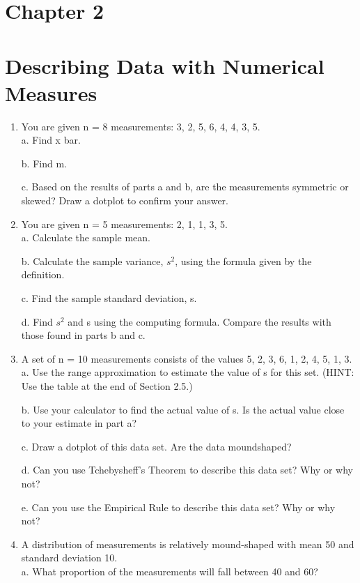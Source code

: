 \documentclass{article}
\begin{document}
\section*{Chapter 2}
\section*{Describing Data with Numerical Measures}
\begin{enumerate}
    \item You are given n = 8 measurements: 3, 2, 5, 6, 4, 4, 3, 5. \\
    a. Find x bar.
    
    b. Find m.
    
    c. Based on the results of parts a and b, are the measurements symmetric or skewed? Draw a dotplot to confirm your answer.

    \item You are given n = 5 measurements: 2, 1, 1, 3, 5. \\
    a. Calculate the sample mean.

    b. Calculate the sample variance, $s^2$, using the formula given by the definition.
    
    c. Find the sample standard deviation, s.

    d. Find $s^2$ and s using the computing formula. Compare the results with those found in parts b and c.

    \item A set of n = 10 measurements consists of the values 5, 2, 3, 6, 1, 2, 4, 5, 1, 3. \\
    a. Use the range approximation to estimate the value of s for this set. (HINT: Use the table at the end of Section 2.5.)

    b. Use your calculator to find the actual value of s. Is the actual value close to your estimate in part a?

    c. Draw a dotplot of this data set. Are the data moundshaped?

    d. Can you use Tchebysheff’s Theorem to describe this data set? Why or why not?
    
    e. Can you use the Empirical Rule to describe this data set? Why or why not?

    \item A distribution of measurements is relatively mound-shaped with mean 50 and standard deviation 10. \\
    a. What proportion of the measurements will fall between 40 and 60?
    

\end{enumerate}
\end{document}
